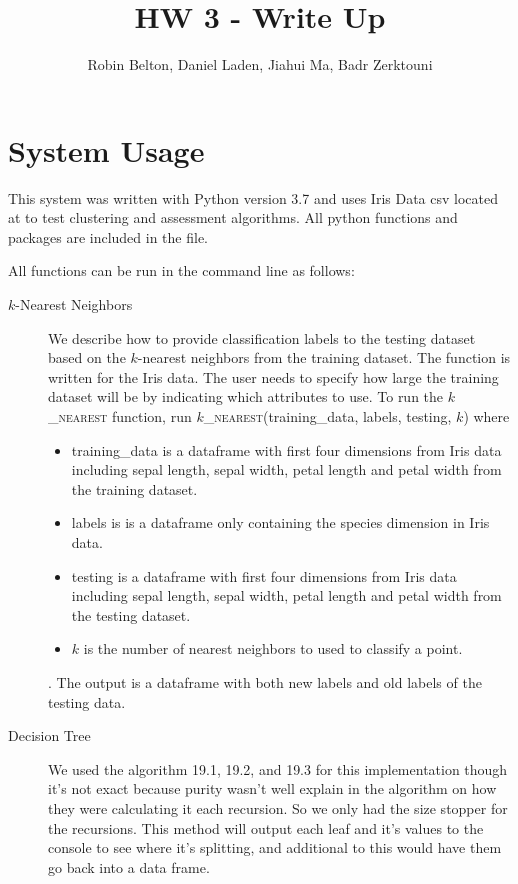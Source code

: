 \documentclass[psamsfonts,onesided,10pt]{amsart}
\title{HW 3 - Write Up}
\author{Robin Belton, Daniel Laden, Jiahui Ma,  Badr Zerktouni}
\begin{document}
\maketitle

\section{System Usage}

This system was written with Python version 3.7 and uses Iris Data csv located at  
to test clustering and assessment algorithms. All python functions and packages are included in the  file.

All functions can be run in the command line as follows:

\begin{description}
\item[$k$-Nearest Neighbors] We describe how to provide classification labels to the testing dataset based on the $k$-nearest neighbors from the training dataset. The function is written for the Iris data. The user needs to specify how large the training dataset will be by indicating which attributes to use. To run the \textsc{$k$\_nearest} function, run \textsc{$k$\_nearest}(training\_data, labels, testing, $k$) where 
	\begin{itemize}
	\item training\_data is a dataframe with first four dimensions from Iris data including sepal length, sepal width, petal length and petal width from the training dataset.
	\item labels is is a dataframe only containing the species dimension in Iris data.
	\item testing is a dataframe with first four dimensions from Iris data including sepal length, sepal width, petal length and petal width from the testing dataset.
	\item $k$ is the number of nearest neighbors to used to classify a point.
	\end{itemize}. 
The output is a dataframe with both new labels and old labels of the testing data.
\item[Decision Tree] We used the algorithm 19.1, 19.2, and 19.3 for this implementation though it's not exact because purity wasn't well explain in the algorithm on how they were calculating it each recursion. So we only had the size stopper for the recursions. This method will output each leaf and it's values to the console to see where it's splitting, and additional to this would have them go back into a data frame.

\end{description}
\end{document}
